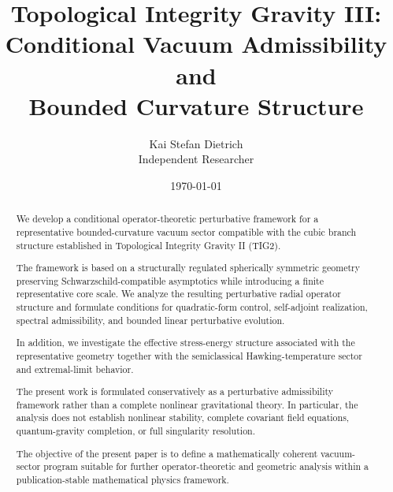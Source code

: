 \documentclass[12pt]{article}
\title{
\Large
Topological Integrity Gravity III:\\[0.3cm]
\large
Conditional Vacuum Admissibility and\\
Bounded Curvature Structure
}
\author{
Kai Stefan Dietrich\\
Independent Researcher
}
\date{\today}
\begin{document}
\maketitle


\begin{abstract}

We develop a conditional operator-theoretic perturbative framework for a representative bounded-curvature vacuum sector compatible with the cubic branch structure established in Topological Integrity Gravity II (TIG2).

The framework is based on a structurally regulated spherically symmetric geometry preserving Schwarzschild-compatible asymptotics while introducing a finite representative core scale. We analyze the resulting perturbative radial operator structure and formulate conditions for quadratic-form control, self-adjoint realization, spectral admissibility, and bounded linear perturbative evolution.

In addition, we investigate the effective stress-energy structure associated with the representative geometry together with the semiclassical Hawking-temperature sector and extremal-limit behavior.

The present work is formulated conservatively as a perturbative admissibility framework rather than a complete nonlinear gravitational theory. In particular, the analysis does not establish nonlinear stability, complete covariant field equations, quantum-gravity completion, or full singularity resolution.

The objective of the present paper is to define a mathematically coherent vacuum-sector program suitable for further operator-theoretic and geometric analysis within a publication-stable mathematical physics framework.

\end{abstract}















\end{document}
